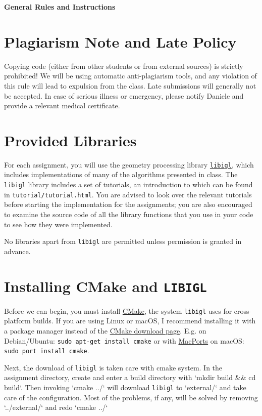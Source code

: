 \documentclass[11pt]{amsart}
\begin{document}
\hspace{50pt}

\begin{center}

{\Huge \textbf{General Rules and Instructions}}\\
\end{center}

\section*{Plagiarism Note and Late Policy}
Copying code (either from other students or from external sources) is strictly
prohibited! We will be using automatic anti-plagiarism tools, and any violation
of this rule will lead to expulsion from the class. Late submissions will
generally not be accepted. In case of serious illness or emergency, please notify
Daniele and provide a relevant medical certificate.

\section*{Provided Libraries}
For each assignment, you will use the geometry processing library
\href{https://github.com/libigl/libigl/}{\texttt{libigl}}, which
includes implementations of many of the algorithms presented in class.
The \texttt{libigl} library
includes a set of tutorials, an introduction to which can be found in
\texttt{tutorial/tutorial.html}. You are advised to look over the relevant
tutorials before starting the implementation for the
assignments; you are also encouraged to examine the source code of all
the library functions that you use in your code to see how they were
implemented.

No libraries apart from \texttt{libigl} are permitted unless permission is
granted in advance.

\section*{Installing CMake and \texttt{LIBIGL}}
Before we can begin, you must install \href{https://cmake.org/}{CMake}, the
system \texttt{libigl} uses for cross-platform builds. If you are using Linux or
macOS, I recommend installing it with a package manager instead of the
\href{https://cmake.org/download/}{CMake download page}.
E.g. on Debian/Ubuntu: \texttt{sudo apt-get install cmake} or with
\href{http://macports.org}{MacPorts} on macOS: \texttt{sudo port install cmake}.

Next, the download of \texttt{libigl} is taken care with cmake system.
In the assignment directory, create and enter a build directory with `mkdir build && cd build`.
Then invoking `cmake ../` will download \texttt{libigl} to `external/` and take care of the configuration.
Most of the problems, if any, will be solved by removing `../external/` and redo `cmake ../` 
\end{document}
